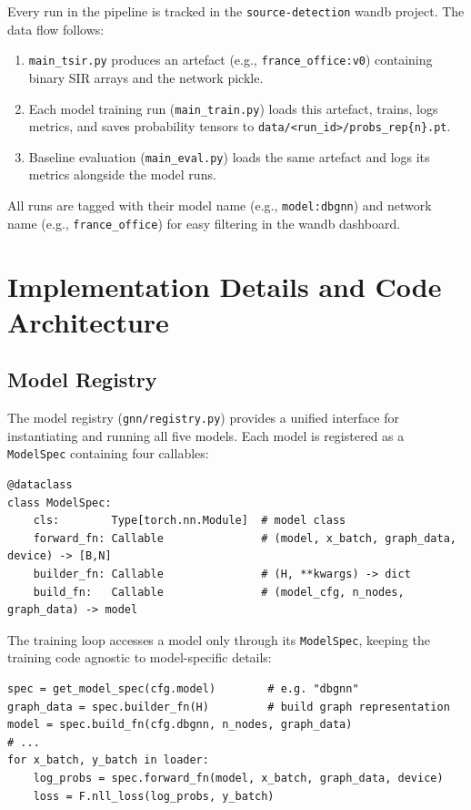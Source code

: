 \documentclass[12pt,a4paper]{report}
\begin{document}
Every run in the pipeline is tracked in the \texttt{source-detection} wandb
project. The data flow follows:

\begin{enumerate}
  \item \texttt{main\_tsir.py} produces an artefact (e.g.,
    \texttt{france\_office:v0}) containing binary SIR arrays and the network
    pickle.
  \item Each model training run (\texttt{main\_train.py}) loads this artefact,
    trains, logs metrics, and saves probability tensors to
    \texttt{data/<run\_id>/probs\_rep\{n\}.pt}.
  \item Baseline evaluation (\texttt{main\_eval.py}) loads the same artefact
    and logs its metrics alongside the model runs.
\end{enumerate}

All runs are tagged with their model name (e.g., \texttt{model:dbgnn}) and
network name (e.g., \texttt{france\_office}) for easy filtering in the wandb
dashboard.

\chapter{Implementation Details and Code Architecture}
\label{chap:implementation}

\section{Model Registry}

The model registry (\texttt{gnn/registry.py}) provides a unified interface for
instantiating and running all five models. Each model is registered as a
\texttt{ModelSpec} containing four callables:

\begin{lstlisting}[caption={ModelSpec dataclass (from \texttt{gnn/registry.py}).}]
@dataclass
class ModelSpec:
    cls:        Type[torch.nn.Module]  # model class
    forward_fn: Callable               # (model, x_batch, graph_data, device) -> [B,N]
    builder_fn: Callable               # (H, **kwargs) -> dict
    build_fn:   Callable               # (model_cfg, n_nodes, graph_data) -> model
\end{lstlisting}

The training loop accesses a model only through its \texttt{ModelSpec}, keeping
the training code agnostic to model-specific details:
\begin{lstlisting}[caption={Generic training call via registry.}]
spec = get_model_spec(cfg.model)        # e.g. "dbgnn"
graph_data = spec.builder_fn(H)         # build graph representation
model = spec.build_fn(cfg.dbgnn, n_nodes, graph_data)
# ...
for x_batch, y_batch in loader:
    log_probs = spec.forward_fn(model, x_batch, graph_data, device)
    loss = F.nll_loss(log_probs, y_batch)
\end{lstlisting}
\end{document}
